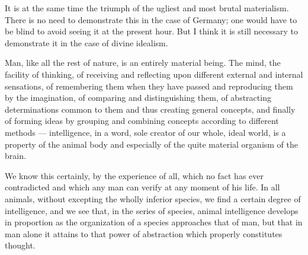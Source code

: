 \documentclass[12pt]{report}
\begin{document}
It is at the same time the triumph of the ugliest and most brutal materialism. There is no need to demonstrate this in the case of Germany; one would have to be blind to avoid seeing it at the present hour. But I think it is still necessary to demonstrate it in the case of divine idealism.


Man, like all the rest of nature, is an entirely material being. The mind, the facility of thinking, of receiving and reflecting upon different external and internal sensations, of remembering them when they have passed and reproducing them by the imagination, of comparing and distinguishing them, of abstracting determinations common to them and thus creating general concepts, and finally of forming ideas by grouping and combining concepts according to different methods — intelligence, in a word, sole creator of our whole, ideal world, is a property of the animal body and especially of the quite material organism of the brain.


We know this certainly, by the experience of all, which no fact has ever contradicted and which any man can verify at any moment of his life. In all animals, without excepting the wholly inferior species, we find a certain degree of intelligence, and we see that, in the series of species, animal intelligence develops in proportion as the organization of a species approaches that of man, but that in man alone it attains to that power of abstraction which properly constitutes thought.
\end{document}
